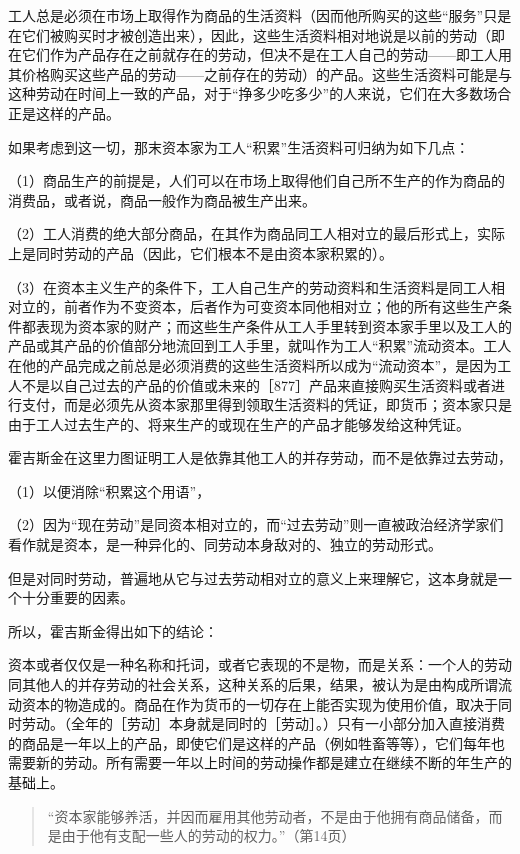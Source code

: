 工人总是必须在市场上取得作为商品的生活资料（因而他所购买的这些“服务”只是在它们被购买时才被创造出来），因此，这些生活资料相对地说是以前的劳动（即在它们作为产品存在之前就存在的劳动，但决不是在工人自己的劳动——即工人用其价格购买这些产品的劳动——之前存在的劳动）的产品。这些生活资料可能是与这种劳动在时间上一致的产品，对于“挣多少吃多少”的人来说，它们在大多数场合正是这样的产品。

如果考虑到这一切，那末资本家为工人“积累”生活资料可归纳为如下几点：

（1）商品生产的前提是，人们可以在市场上取得他们自己所不生产的作为商品的消费品，或者说，商品一般作为商品被生产出来。

（2）工人消费的绝大部分商品，在其作为商品同工人相对立的最后形式上，实际上是同时劳动的产品（因此，它们根本不是由资本家积累的）。

（3）在资本主义生产的条件下，工人自己生产的劳动资料和生活资料是同工人相对立的，前者作为不变资本，后者作为可变资本同他相对立；他的所有这些生产条件都表现为资本家的财产；而这些生产条件从工人手里转到资本家手里以及工人的产品或其产品的价值部分地流回到工人手里，就叫作为工人“积累”流动资本。工人在他的产品完成之前总是必须消费的这些生活资料所以成为“流动资本”，是因为工人不是以自己过去的产品的价值或未来的［877］产品来直接购买生活资料或者进行支付，而是必须先从资本家那里得到领取生活资料的凭证，即货币；资本家只是由于工人过去生产的、将来生产的或现在生产的产品才能够发给这种凭证。

霍吉斯金在这里力图证明工人是依靠其他工人的并存劳动，而不是依靠过去劳动，

（1）以便消除“积累这个用语”，

（2）因为“现在劳动”是同资本相对立的，而“过去劳动”则一直被政治经济学家们看作就是资本，是一种异化的、同劳动本身敌对的、独立的劳动形式。

但是对同时劳动，普遍地从它与过去劳动相对立的意义上来理解它，这本身就是一个十分重要的因素。

所以，霍吉斯金得出如下的结论：

资本或者仅仅是一种名称和托词，或者它表现的不是物，而是关系：一个人的劳动同其他人的并存劳动的社会关系，这种关系的后果，结果，被认为是由构成所谓流动资本的物造成的。商品在作为货币的一切存在上能否实现为使用价值，取决于同时劳动。（全年的［劳动］本身就是同时的［劳动］。）只有一小部分加入直接消费的商品是一年以上的产品，即使它们是这样的产品（例如牲畜等等），它们每年也需要新的劳动。所有需要一年以上时间的劳动操作都是建立在继续不断的年生产的基础上。

\begin{quote}{“资本家能够养活，并因而雇用其他劳动者，不是由于他拥有商品储备，而是由于他有支配一些人的劳动的权力。”（第14页）}\end{quote}

